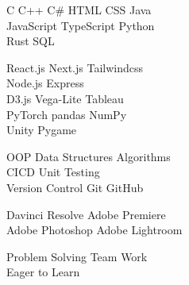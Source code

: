 \documentclass[]{main}
\begin{document}
\begin{minipage}[t]{0.33\textwidth}
C \textbullet{}   C++ \textbullet{} C\# \textbullet{} HTML \textbullet{} CSS \textbullet{} Java \\
JavaScript \textbullet{} TypeScript \textbullet{} Python \\
Rust \textbullet{} SQL
\sectionsep

React.js \textbullet{} Next.js \textbullet{} Tailwindcss \\
Node.js \textbullet{} Express \\
D3.js \textbullet{} Vega-Lite \textbullet{} Tableau\\
PyTorch \textbullet{} pandas \textbullet{} NumPy \\
Unity \textbullet{} Pygame
\sectionsep

OOP \textbullet{} Data Structures \textbullet{} Algorithms \\ CI\/CD \textbullet{} Unit Testing 
 \\ Version Control \textbullet{} Git \textbullet{} GitHub
 
\sectionsep
 
Davinci Resolve \textbullet{} Adobe Premiere
\\ Adobe Photoshop \textbullet{} Adobe Lightroom

\sectionsep

Problem Solving  \textbullet{} Team Work \\
Eager to Learn \\
\sectionsep

%
%

\end{minipage} 
\hfill
\end{document}
